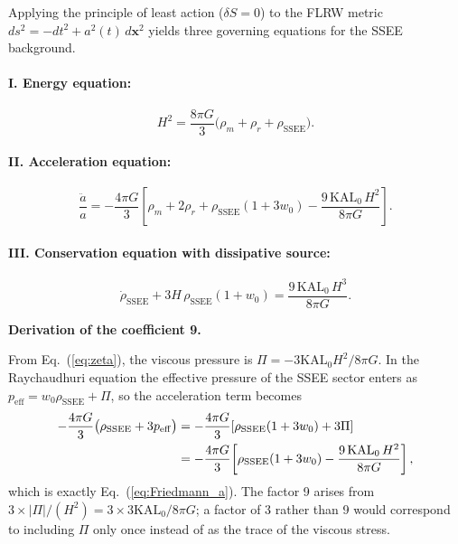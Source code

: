 Applying the principle of least action ($\delta S = 0$) to the
FLRW metric $ds^{2} = -dt^{2} + a^{2}(t)\,d\mathbf{x}^{2}$ yields
three governing equations for the SSEE background.

\paragraph{I. Energy equation:}
\begin{equation}
  H^{2}
    = \frac{8\pi G}{3}
      \bigl(\rho_{m} + \rho_{r} + \rho_{\mathrm{SSEE}}\bigr).
  \label{eq:Friedmann_H}
\end{equation}

\paragraph{II. Acceleration equation:}
\begin{equation}
  \frac{\ddot{a}}{a}
    = -\frac{4\pi G}{3}
      \!\left[\rho_{m} + 2\rho_{r}
        + \rho_{\mathrm{SSEE}}\!\left(1 + 3w_{0}\right)
        - \frac{9\,\mathrm{KAL}_{0}\,H^{2}}{8\pi G}
      \right].
  \label{eq:Friedmann_a}
\end{equation}

\paragraph{III. Conservation equation with dissipative source:}
\begin{equation}
  \dot{\rho}_{\mathrm{SSEE}}
    + 3H\,\rho_{\mathrm{SSEE}}\!\left(1 + w_{0}\right)
    = \frac{9\,\mathrm{KAL}_{0}\,H^{3}}{8\pi G}.
  \label{eq:continuity}
\end{equation}

\noindent\textbf{Derivation of the coefficient 9.}\par\smallskip
\noindent From Eq.~(\ref{eq:zeta}), the viscous pressure is
$\Pi = -3\mathrm{KAL}_{0}H^{2}/8\pi G$.
In the Raychaudhuri equation the effective pressure of the SSEE sector enters as
$p_{\mathrm{eff}} = w_{0}\rho_{\mathrm{SSEE}} + \Pi$, so the acceleration term becomes
%
\begin{align}
  -\frac{4\pi G}{3}\bigl(\rho_{\mathrm{SSEE}} + 3p_{\mathrm{eff}}\bigr)
  &= -\frac{4\pi G}{3}
     \!\left[\rho_{\mathrm{SSEE}}(1+3w_{0}) + 3\Pi\right] \notag\\
  &= -\frac{4\pi G}{3}
     \!\left[\rho_{\mathrm{SSEE}}(1+3w_{0})
             - \frac{9\,\mathrm{KAL}_{0}\,H^{2}}{8\pi G}\right],
  \label{eq:deriv_coeff9}
\end{align}
which is exactly Eq.~(\ref{eq:Friedmann_a}).  The factor 9 arises from
$3 \times |\Pi|/(H^{2}) = 3 \times 3\mathrm{KAL}_{0}/8\pi G$; a factor
of 3 rather than 9 would correspond to including $\Pi$ only once instead
of as the trace of the viscous stress.

